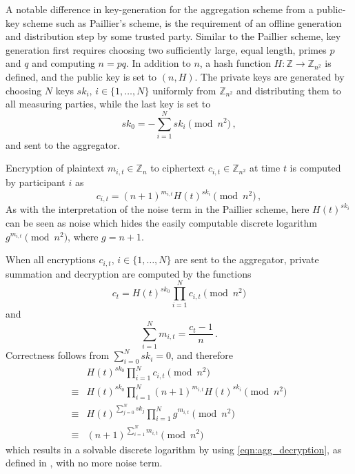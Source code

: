 \documentclass[twocolumn]{autart}
\theoremstyle{definition}
\begin{document}
A notable difference in key-generation for the aggregation scheme from a public-key scheme such as Paillier's scheme, is the requirement of an offline generation and distribution step by some trusted party. Similar to the Paillier scheme, key generation first requires choosing two sufficiently large, equal length, primes $p$ and $q$ and computing $n=pq$. In addition to $n$, a hash function $H:\mathbb{Z} \rightarrow \mathbb{Z}_{n^2}$ is defined, and the public key is set to $(n, H)$. The private keys are generated by choosing $N$ keys $sk_i,\,i \in \{1,\dots,N\}$ uniformly from $\mathbb{Z}_{n^2}$ and distributing them to all measuring parties, while the last key is set to
\begin{equation}
    sk_0 = -\sum^{N}_{i=1}sk_i \pmod{n^2}\,,
\end{equation}
and sent to the aggregator.

Encryption of plaintext $m_{i,t} \in \mathbb{Z}_n$ to ciphertext $c_{i,t} \in \mathbb{Z}_{n^2}$ at time $t$ is computed by participant $i$ as
\begin{equation}
    c_{i,t} = (n+1)^{m_{i,t}} H(t)^{sk_i} \pmod{n^2}\,,
\end{equation}
As with the interpretation of the noise term in the Paillier scheme, here $H(t)^{sk_i}$ can be seen as noise which hides the easily computable discrete logarithm $g^{m_{i,t}} \pmod{n^2}$, where $g=n+1$.

When all encryptions $c_{i,t},\,i \in \{1,\dots,N\}$ are sent to the aggregator, private summation and decryption are computed by the functions
\begin{equation}
    c_{t} = H(t)^{sk_0}\prod^{N}_{i=1}c_{i,t} \pmod{n^2}
\end{equation}
and
\begin{equation}
    \sum^{N}_{i=1}m_{i,t} = \frac{c_{t}-1}{n}\,. \label{eqn:agg_decryption}
\end{equation}
Correctness follows from $\sum^{N}_{i=0}sk_i = 0$, and therefore
\begin{align}
    &H(t)^{sk_0}\prod^{N}_{i=1}c_{i,t} \pmod{n^2} \\
    \equiv &H(t)^{sk_0}\prod^{N}_{i=1}(n+1)^{m_{i,t}} H(t)^{sk_i} \pmod{n^2} \\
    \equiv &H(t)^{\sum^N_{j=0}sk_j} \prod^{N}_{i=1}g^{m_{i,t}} \pmod{n^2} \\
    \equiv &(n+1)^{\sum^N_{i=1}m_{i,t}} \pmod{n^2}
\end{align}
which results in a solvable discrete logarithm by using \eqref{eqn:agg_decryption}, as defined in \cite{joyeScalableSchemePrivacyPreserving2013}, with no more noise term.
\end{document}
